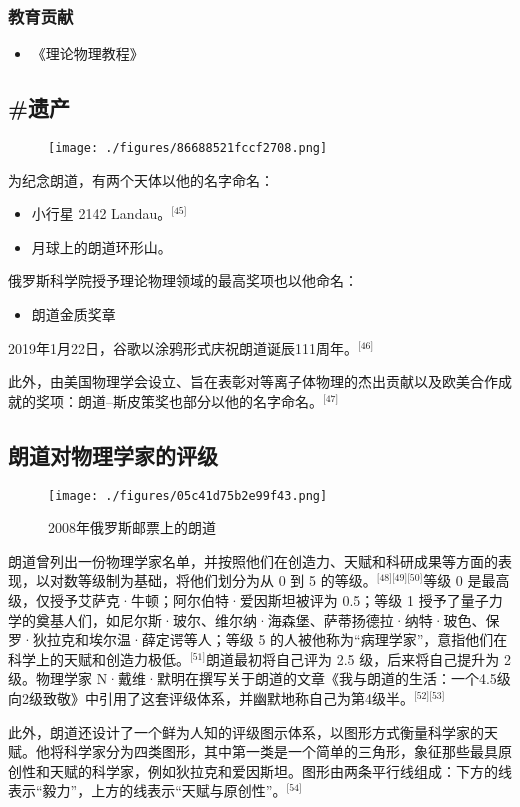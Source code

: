 \subsubsection{教育贡献}
\begin{itemize}
\item 《理论物理教程》
\end{itemize}
\subsection{#遗产}
\begin{figure}[ht]
\centering
\texttt{[image: ./figures/86688521fccf2708.png]}
\caption{} \label{fig_LFLD_5}
\end{figure}
为纪念朗道，有两个天体以他的名字命名：
\begin{itemize}
\item 小行星 2142 Landau。\(^\text{[45]}\)
\item 月球上的朗道环形山。
\end{itemize}
俄罗斯科学院授予理论物理领域的最高奖项也以他命名：
\begin{itemize}
\item 朗道金质奖章
\end{itemize}
2019年1月22日，谷歌以涂鸦形式庆祝朗道诞辰111周年。\(^\text{[46]}\)

此外，由美国物理学会设立、旨在表彰对等离子体物理的杰出贡献以及欧美合作成就的奖项：朗道–斯皮策奖也部分以他的名字命名。\(^\text{[47]}\)
\subsection{朗道对物理学家的评级}
\begin{figure}[ht]
\centering
\texttt{[image: ./figures/05c41d75b2e99f43.png]}
\caption{2008年俄罗斯邮票上的朗道} \label{fig_LFLD_6}
\end{figure}
朗道曾列出一份物理学家名单，并按照他们在创造力、天赋和科研成果等方面的表现，以对数等级制为基础，将他们划分为从 0 到 5 的等级。\(^\text{[48][49][50]}\)等级 0 是最高级，仅授予艾萨克·牛顿；阿尔伯特·爱因斯坦被评为 0.5；等级 1 授予了量子力学的奠基人们，如尼尔斯·玻尔、维尔纳·海森堡、萨蒂扬德拉·纳特·玻色、保罗·狄拉克和埃尔温·薛定谔等人；等级 5 的人被他称为“病理学家”，意指他们在科学上的天赋和创造力极低。\(^\text{[51]}\)朗道最初将自己评为 2.5 级，后来将自己提升为 2 级。物理学家 N·戴维·默明在撰写关于朗道的文章《我与朗道的生活：一个4.5级向2级致敬》中引用了这套评级体系，并幽默地称自己为第4级半。\(^\text{[52][53]}\)

此外，朗道还设计了一个鲜为人知的评级图示体系，以图形方式衡量科学家的天赋。他将科学家分为四类图形，其中第一类是一个简单的三角形，象征那些最具原创性和天赋的科学家，例如狄拉克和爱因斯坦。图形由两条平行线组成：下方的线表示“毅力”，上方的线表示“天赋与原创性”。\(^\text{[54]}\)
